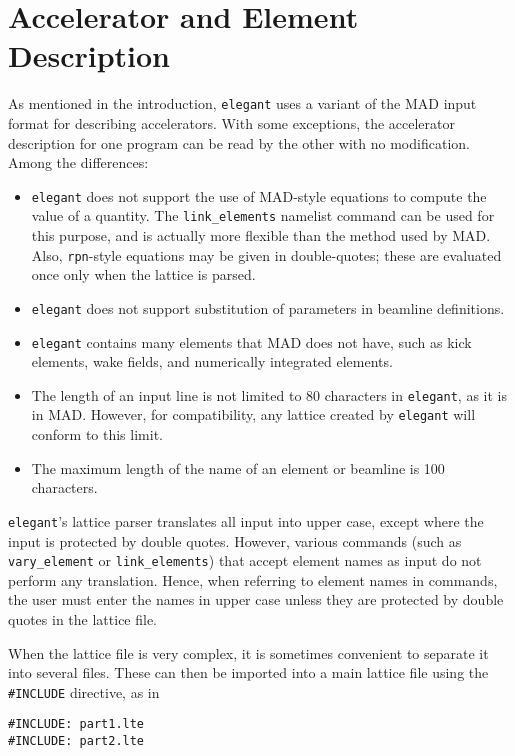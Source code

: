 \documentclass[11pt]{article}
\begin{document}
\newpage 

\section{Accelerator and Element Description}

As mentioned in the introduction, {\tt elegant} uses a variant of the
MAD input format for describing accelerators.  With some exceptions,
the accelerator description for one program can be read by the other
with no modification.  Among the differences:
\begin{itemize}
\item {\tt elegant} does not support the use of MAD-style equations to compute
the value of a quantity.  The \verb|link_elements| namelist command
can be used for this purpose, and is actually more flexible than the
method used by MAD.  Also, \verb|rpn|-style equations may be given
in double-quotes; these are evaluated once only when the lattice
is parsed.
\item {\tt elegant} does not support substitution of parameters in
beamline definitions.
\item {\tt elegant} contains many elements that MAD does not have, such
as kick elements, wake fields, and numerically integrated elements.
\item The length of an input line is not limited to 80 characters in 
{\tt elegant}, as it is in MAD.  However, for compatibility, any lattice
created by {\tt elegant} will conform to this limit.
\item The maximum length of the name of an element or beamline is 100 characters.
\end{itemize}

{\tt elegant}'s lattice parser translates all input into upper case,
except where the input is protected by double quotes.  However,
various commands (such as {\tt vary\_element} or {\tt link\_elements})
that accept element names as input do not perform any translation.
Hence, when referring to element names in commands, the user must
enter the names in upper case unless they are protected by double
quotes in the lattice file.  

When the lattice file is very complex, it is sometimes convenient to 
separate it into several files. These can then be imported into a main lattice file
using the \verb|#INCLUDE| directive, as in
\begin{verbatim}
#INCLUDE: part1.lte
#INCLUDE: part2.lte
\end{verbatim}
\end{document}
